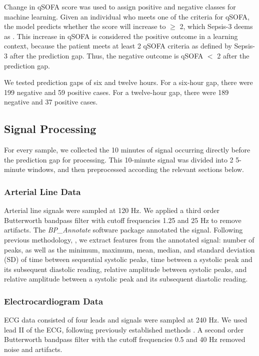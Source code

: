 Change in qSOFA score was used to assign positive and negative classes for machine learning. Given an individual who meets one of the criteria for qSOFA, the model predicts whether the score will increase to $\geq$ 2, which Sepsis-3 deems as  \autocite{sepsis-3}. This increase in qSOFA is considered the positive outcome in a learning context, because the patient meets at least 2 qSOFA criteria as defined by Sepsis-3 after the prediction gap. Thus, the negative outcome is qSOFA $<$ 2 after the prediction gap.

We tested prediction gaps of six and twelve hours. For a six-hour gap, there were 199 negative and 59 positive cases. For a twelve-hour gap, there were 189 negative and 37 positive cases.

\subsection*{Signal Processing} \label{sec:methods_sigproc}
For every sample, we collected the 10 minutes of signal occurring directly before the prediction gap for processing. This 10-minute signal was divided into 2 5-minute windows, and then preprocessed according the relevant sections below.

\subsubsection*{Arterial Line Data} \label{sec:methods_art_data}
Arterial line signals were sampled at 120 Hz. We applied a third order Butterworth bandpass filter with cutoff frequencies 1.25 and 25 Hz  to remove artifacts. The \textit{BP\_Annotate} software package \autocite{laurin_bp_annotate_2017} annotated the signal. Following previous methodology, \autocite{luo_severity_2012, hernandez_multimodal_2021}, we extract features from the annotated signal: number of peaks, as well as the minimum, maximum, mean, median, and standard deviation (SD) of time between sequential systolic peaks, time between a systolic peak and its subsequent diastolic reading, relative amplitude between systolic peaks, and relative amplitude between a systolic peak and its subsequent diastolic reading.

\subsubsection*{Electrocardiogram Data} \label{sec:methods_ecg_data}
ECG data consisted of four leads and signals were sampled at 240 Hz. We used lead II of the ECG, following previously established methods \autocite{belle_signal_2016}. A second order Butterworth bandpass filter with the cutoff frequencies 0.5 and 40 Hz removed noise and artifacts.

